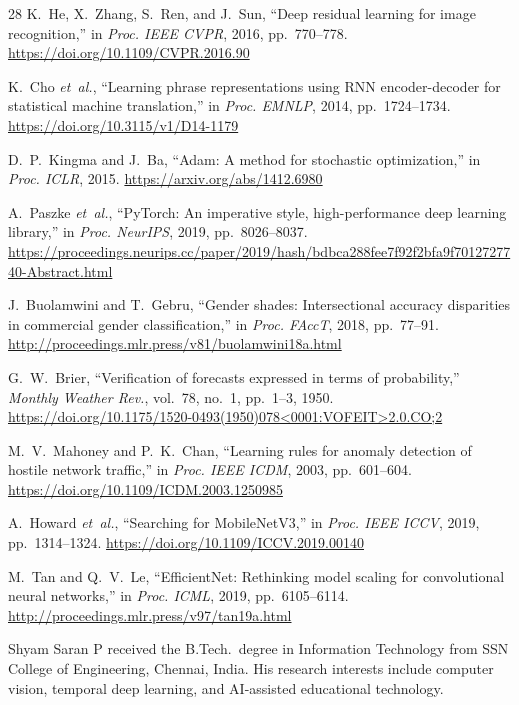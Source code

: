 \documentclass[journal]{IEEEtran}
\begin{document}
\begin{thebibliography}{28}
K.~He, X.~Zhang, S.~Ren, and J.~Sun, ``Deep residual learning for image recognition,'' in \emph{Proc. IEEE CVPR}, 2016, pp.~770--778. \url{https://doi.org/10.1109/CVPR.2016.90}

K.~Cho \emph{et~al.}, ``Learning phrase representations using RNN encoder-decoder for statistical machine translation,'' in \emph{Proc. EMNLP}, 2014, pp.~1724--1734. \url{https://doi.org/10.3115/v1/D14-1179}

D.~P.~Kingma and J.~Ba, ``Adam: A method for stochastic optimization,'' in \emph{Proc. ICLR}, 2015. \url{https://arxiv.org/abs/1412.6980}

A.~Paszke \emph{et~al.}, ``PyTorch: An imperative style, high-performance deep learning library,'' in \emph{Proc. NeurIPS}, 2019, pp.~8026--8037. \url{https://proceedings.neurips.cc/paper/2019/hash/bdbca288fee7f92f2bfa9f7012727740-Abstract.html}

J.~Buolamwini and T.~Gebru, ``Gender shades: Intersectional accuracy disparities in commercial gender classification,'' in \emph{Proc. FAccT}, 2018, pp.~77--91. \url{http://proceedings.mlr.press/v81/buolamwini18a.html}

G.~W.~Brier, ``Verification of forecasts expressed in terms of probability,'' \emph{Monthly Weather Rev.}, vol.~78, no.~1, pp.~1--3, 1950. \url{https://doi.org/10.1175/1520-0493(1950)078<0001:VOFEIT>2.0.CO;2}

M.~V.~Mahoney and P.~K.~Chan, ``Learning rules for anomaly detection of hostile network traffic,'' in \emph{Proc. IEEE ICDM}, 2003, pp.~601--604. \url{https://doi.org/10.1109/ICDM.2003.1250985}

A.~Howard \emph{et~al.}, ``Searching for MobileNetV3,'' in \emph{Proc. IEEE ICCV}, 2019, pp.~1314--1324. \url{https://doi.org/10.1109/ICCV.2019.00140}

M.~Tan and Q.~V.~Le, ``EfficientNet: Rethinking model scaling for convolutional neural networks,'' in \emph{Proc. ICML}, 2019, pp.~6105--6114. \url{http://proceedings.mlr.press/v97/tan19a.html}

\end{thebibliography}



\balance

\begin{IEEEbiography}{Shyam Saran P}
received the B.Tech.\ degree in Information Technology from SSN College of Engineering, Chennai, India. His research interests include computer vision, temporal deep learning, and AI-assisted educational technology.
\end{IEEEbiography}
\end{document}
